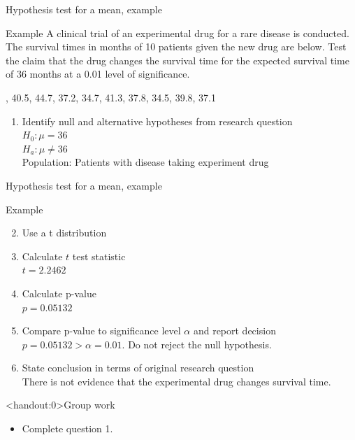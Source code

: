 \documentclass[xcolor=table, aspectratio=169, bigger, handout]{beamer}
\begin{document}
\begin{frame}{Hypothesis test for a mean, example}
\begin{exampleblock}{Example}
A clinical trial of an experimental drug for a rare disease is conducted. The survival times in months of 10 patients given the new drug are below. Test the claim that the drug changes the survival time for the expected survival time of 36 months at a 0.01 level of significance.\\
\medskip
{, 40.5, 44.7, 37.2, 34.7, 41.3, 37.8, 34.5, 39.8, 37.1
\par}
\begin{enumerate}
\pause\item Identify null and alternative hypotheses from research question\\
\pause$H_0: \mu = 36$\\
$H_a: \mu \ne 36$\\
Population: Patients with disease taking experiment drug
\end{enumerate}
\end{exampleblock}
\end{frame}

\begin{frame}{Hypothesis test for a mean, example}
\begin{exampleblock}{Example}
\begin{enumerate}
\setcounter{enumi}{1}

\item Use a t distribution
\pause\item Calculate $t$ test statistic\\
\pause$t=2.2462$
\pause\item Calculate p-value\\
\pause$p = 0.05132$
\pause\item Compare p-value to significance level $\alpha$ and report decision\\
\pause$p = 0.05132 > \alpha = 0.01$. Do not reject the null hypothesis.
\pause\item State conclusion in terms of original research question\\
\pause There is not evidence that the experimental drug changes survival time.
\end{enumerate}

\end{exampleblock}
\end{frame}

\begin{frame}<handout:0>{Group work}
\begin{block}{}
\large
\begin{itemize}
\item Complete question 1.
\end{itemize}
\end{block}
\end{frame}
\end{document}
